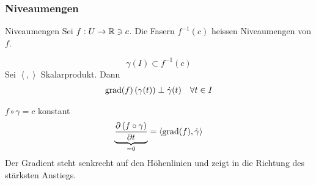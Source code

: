 \subsubsection{Niveaumengen}
\begin{Def}{Niveaumengen}
  Sei $f:U\to\mathbb{R}\ni c$. Die Fasern $f^{-1}(c)$ heissen Niveaumengen von $f$.
\end{Def}
\begin{Sat}
  \[\gamma(I)\subset f^{-1}(c)\]
  Sei $\left\langle , \right\rangle$ Skalarprodukt. Dann
  \begin{align*}
    \operatorname{grad}(f)\left( \gamma(t) \right)\perp\dot\gamma(t)&&\forall t\in I
  \end{align*}
\end{Sat}
\begin{Bew}
  $f\circ \gamma=c$ konstant
  \[\underbrace{\dfrac{\partial \left( f\circ \gamma \right)}{\partial t}}_{=0}=\left\langle \operatorname{grad}(f),\dot\gamma \right\rangle \]
  Der Gradient steht senkrecht auf den Höhenlinien und zeigt in die Richtung des stärksten Anstiegs.
\end{Bew}
